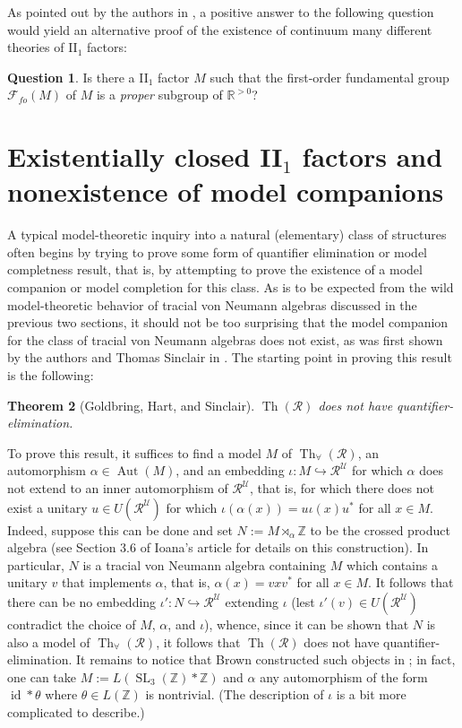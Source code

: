 \documentclass[12pt]{amsart}
\newtheorem{thm}{Theorem}[section]
\theoremstyle{definition}
\newtheorem{question}[thm]{Question}
\def\bb{\mathbb}
\def\bb{\mathbb}
\def\cal{\mathcal}
\def\u{\mathsf 1}
\def \Th{\operatorname{Th}}
\def \R{\mathcal R}
\def \u{\mathcal U}
\begin{document}
As pointed out by the authors in \cite{GHgames}, a positive answer to the following question would yield an alternative proof of the existence of continuum many different theories of II$_1$ factors:

\begin{question}
Is there a II$_1$ factor $M$ such that the first-order fundamental group $\cal F_{fo}(M)$ of $M$ is a \emph{proper} subgroup of $\bb R^{>0}$? 
\end{question}

\section{Existentially closed II$_1$ factors and nonexistence of model companions}

A typical model-theoretic inquiry into a natural (elementary) class of structures often begins by trying to prove some form of quantifier elimination or model completness result, that is, by attempting to prove the existence of a model companion or model completion for this class.  As is to be expected from the wild model-theoretic behavior of tracial von Neumann algebras discussed in the previous two sections, it should not be too surprising that the model companion for the class of tracial von Neumann algebras does not exist, as was first shown by the authors and Thomas Sinclair in \cite{GHS}.  The starting point in proving this result is the following:

\begin{thm}[Goldbring, Hart, and Sinclair]\label{noqe}
$\Th(\R)$ does not have quantifier-elimination.
\end{thm}

To prove this result, it suffices to find a model $M$ of $\Th_\forall(\R)$, an automorphism $\alpha\in \operatorname{Aut}(M)$, and an embedding $\iota:M\hookrightarrow \R^\u$ for which $\alpha$ does not extend to an inner automorphism of $\R^\u$, that is, for which there does not exist a unitary $u\in U(\R^\u)$ for which $\iota(\alpha(x))=u\iota(x)u^*$ for all $x\in M$.  Indeed, suppose this can be done and set $N:=M\rtimes_\alpha \bb Z$ to be the crossed product algebra (see Section 3.6 of Ioana's article for details on this construction).  In particular, $N$ is a tracial von Neumann algebra containing $M$ which contains a unitary $v$ that implements $\alpha$, that is, $\alpha(x)=vxv^*$ for all $x\in M$.  It follows that there can be no embedding $\iota':N\hookrightarrow \R^\u$ extending $\iota$ (lest $\iota'(v)\in U(\R^\u)$ contradict the choice of $M$, $\alpha$, and $\iota$), whence, since it can be shown that $N$ is also a model of $\Th_\forall(\R)$, it follows that $\Th(\R)$ does not have quantifier-elimination.  It remains to notice that Brown constructed such objects in \cite{nate}; in fact, one can take $M:=L(\operatorname{SL}_3(\bb Z)*\bb Z)$ and $\alpha$ any automorphism of the form $\operatorname{id}*\theta$ where $\theta\in L(\bb Z)$ is nontrivial.  (The description of $\iota$ is a bit more complicated to describe.)
\end{document}
